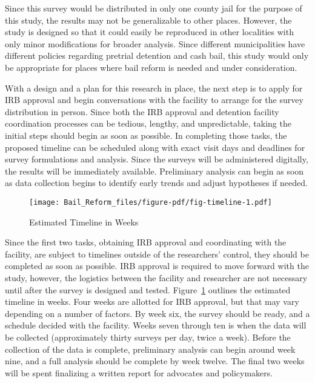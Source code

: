 \documentclass[
  letterpaper,
  DIV=11,
  numbers=noendperiod]{scrartcl}
\begin{document}
Since this survey would be distributed in only one county jail for the
purpose of this study, the results may not be generalizable to other
places. However, the study is designed so that it could easily be
reproduced in other localities with only minor modifications for broader
analysis. Since different municipalities have different policies
regarding pretrial detention and cash bail, this study would only be
appropriate for places where bail reform is needed and under
consideration.

With a design and a plan for this research in place, the next step is to
apply for IRB approval and begin conversations with the facility to
arrange for the survey distribution in person. Since both the IRB
approval and detention facility coordination processes can be tedious,
lengthy, and unpredictable, taking the initial steps should begin as
soon as possible. In completing those tasks, the proposed timeline can
be scheduled along with exact visit days and deadlines for survey
formulations and analysis. Since the surveys will be administered
digitally, the results will be immediately available. Preliminary
analysis can begin as soon as data collection begins to identify early
trends and adjust hypotheses if needed.

\begin{figure}

\caption{\label{fig-timeline}Estimated Timeline in Weeks}

{\centering \texttt{[image: Bail\_Reform\_files/figure-pdf/fig-timeline-1.pdf]}

}

\end{figure}

Since the first two tasks, obtaining IRB approval and coordinating with
the facility, are subject to timelines outside of the researchers'
control, they should be completed as soon as possible. IRB approval is
required to move forward with the study, however, the logistics between
the facility and researcher are not necessary until after the survey is
designed and tested. Figure~\ref{fig-timeline} outlines the estimated
timeline in weeks. Four weeks are allotted for IRB approval, but that
may vary depending on a number of factors. By week six, the survey
should be ready, and a schedule decided with the facility. Weeks seven
through ten is when the data will be collected (approximately thirty
surveys per day, twice a week). Before the collection of the data is
complete, preliminary analysis can begin around week nine, and a full
analysis should be complete by week twelve. The final two weeks will be
spent finalizing a written report for advocates and policymakers.
\end{document}
